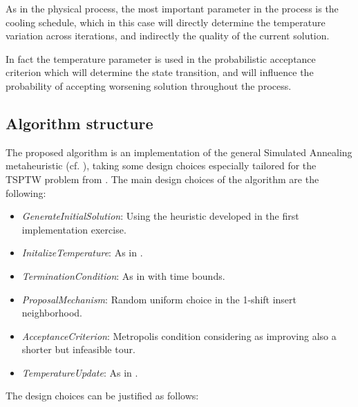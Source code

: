 \begin{homeworkProblem}
As in the physical process, the most important parameter in the process is the cooling schedule, which in this case will  directly determine the temperature variation across iterations, and indirectly the quality of the current solution.

In fact the temperature parameter is used in the probabilistic acceptance criterion which will determine the state transition, and will influence the probability of accepting worsening solution throughout the process.  

\subsection{Algorithm structure} \label{sec:algstrucSA}
The proposed algorithm is an implementation of the general Simulated Annealing metaheuristic (cf. \cite{kirkpatrick1983optimization}), taking some design choices especially tailored for the TSPTW problem from \cite{ohlmann2007compressed}.
The main design choices of the algorithm are the following:
\begin{itemize}
  \item \emph{GenerateInitialSolution}: Using the heuristic developed in the first implementation exercise.
  \item \emph{InitalizeTemperature}: As in \cite{ohlmann2007compressed}.
  \item \emph{TerminationCondition}: As in \cite{ohlmann2007compressed} with time bounds.
  \item \emph{ProposalMechanism}: Random uniform choice in the 1-shift insert neighborhood.
  \item \emph{AcceptanceCriterion}: Metropolis condition considering as improving also a shorter but infeasible tour.
  \item \emph{TemperatureUpdate}: As in \cite{ohlmann2007compressed}.
\end{itemize}

The design choices can be justified as follows:


\end{homeworkProblem}
